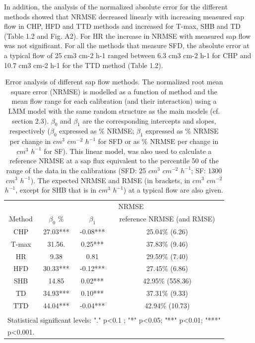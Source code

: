 \documentclass[11pt,twoside]{reedthesis}
\begin{document}
In addition, the analysis of the normalized absolute error for the
different methods showed that NRMSE decreased linearly with increasing
measured sap flow in CHP, HFD and TTD methods and increased for T-max,
SHB and TD (Table 1.2 and Fig. A2). For HR the increase in NRMSE with
measured sap flow was not significant. For all the methods that measure
SFD, the absolute error at a typical flow of 25 cm3 cm-2 h-1 ranged
between 6.3 cm3 cm-2 h-1 for CHP and 10.7 cm3 cm-2 h-1 for the TTD
method (Table 1.2).\par
\begin{table}[!h]

\caption{\label{tab:Ch1T2}Error analysis of different sap flow methods. The normalized root mean square error (NRMSE) is modelled as a function of method and the mean flow range for each calibration (and their interaction) using a LMM model with the same random structure as the main models (cf. section 2.3). $\beta_0$ and $\beta_1$ are the corresponding intercepts and slopes, respectively ($\beta_0$ expressed as \% NRMSE; $\beta_1$ expressed as \% NRMSE per change in $cm^3$ $cm^{-2}$ $h^{-1}$ for SFD or as \% NRMSE per change in $cm^3$ $h^{-1}$ for SF). This linear model, was also used to calculate a reference NRMSE at a sap flux equivalent to the percentile 50 of the range of the data in the calibrations (SFD: 25 $cm^3$ $cm^{-2}$ $h^{-1}$; SF: 1300 $cm^3$ $h^{-1}$). The expected NRMSE and RMSE (in brackets, in $cm^3$ $cm^{-2}$ $h^{-1}$, except for SHB that is in $cm^3$ $h^{-1}$) at a typical flow are also given.}
\centering
\fontsize{10}{12}\selectfont
\begin{tabular}[t]{cccc}
\toprule
\multicolumn{1}{c}{ } & \multicolumn{3}{c}{NRMSE} \\
\cmidrule(l{3pt}r{3pt}){2-4}
Method & $\beta_0$\; \% & $\beta_1$ & reference NRMSE (and RMSE)\\
\midrule
CHP & 27.03*** & -0.08*** & 25.04\% (6.26)\\
T-max & 31.56. & 0.25*** & 37.83\% (9.46)\\
HR & 9.38 & 0.81 & 29.59\% (7.40)\\
HFD & 30.33*** & -0.12*** & 27.45\% (6.86)\\
SHB & 14.85 & 0.02*** & 42.95\% (558.36)\\
TD & 34.93*** & 0.10*** & 37.31\% (9.33)\\
TTD & 44.04*** & -0.04*** & 42.94\% (10.73)\\
\bottomrule
\multicolumn{4}{l}{\textsuperscript{} Statistical significant levels: "." p<0.1 ; "*" p<0.05; "**" p<0.01; "***"}\\
\multicolumn{4}{l}{p<0.001.}\\
\end{tabular}
\end{table}
\end{document}
